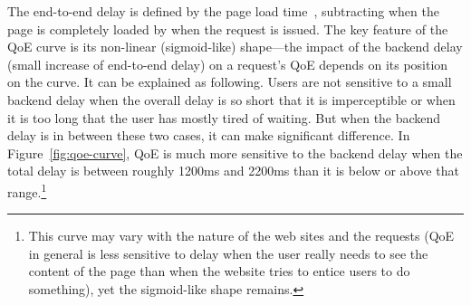The end-to-end delay is defined by the page load time~\cite{wang2013demystify}, \ie subtracting when the page is completely loaded by when the request is issued.
The key feature of the QoE curve is its non-linear (sigmoid-like) shape---\ie the impact of the backend delay (\ie small increase of end-to-end delay) on a request's QoE depends on its position on the curve.
It can be explained as following.
Users are not sensitive to a small backend delay when the overall delay is so short that it is imperceptible or when it is too long that the user has mostly tired of waiting. But when the backend delay is in between these two cases, it can make significant difference. 
In Figure~\ref{fig:qoe-curve}, QoE is much more sensitive to the backend delay when the total delay is between roughly 1200ms and 2200ms than it is below or above that range.\footnote{This curve may vary with the nature of the web sites and the requests (\eg QoE in general is less sensitive to delay when the user really needs to see the content of the page than when the website tries to entice users to do something), yet the sigmoid-like shape remains.}


